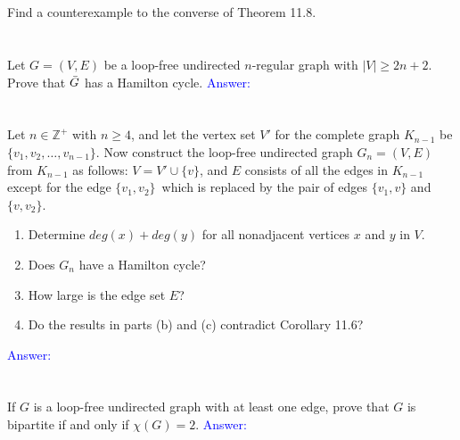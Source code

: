 \documentclass[a4paper]{article}
\begin{document}
\section{}
Find a counterexample to the converse of Theorem 11.8.

\section{}
Let $G=(V,E)$ be a loop-free undirected $n$-regular graph with $|V|\geq 2n+2$. Prove that $\Bar{G}$ has a Hamilton cycle.
\textcolor{blue}{Answer:}

\section{}
Let $n\in\mathbb{Z}^+$ with $n\geq 4$, and let the vertex set $V'$ for the complete graph $K_{n-1}$ be $\{v_1,v_2,\ldots, v_{n-1}\}$. Now construct the loop-free undirected graph $G_n=(V,E)$ from $K_{n-1}$ as follows: $V=V'\cup\{v\}$, and $E$ consists of all the edges in $K_{n-1}$ except for the edge $\{v_1,v_2\}$\, which is replaced by the pair of edges $\{v_1,v\}$ and $\{v,v_2\}$.
    \begin{enumerate}[label=\alph*)]
        \item Determine $deg(x)+deg(y)$ for all nonadjacent vertices $x$ and $y$ in $V$.
        \item Does $G_n$ have a Hamilton cycle?
        \item How large is the edge set $E$?
        \item Do the results in parts (b) and (c) contradict Corollary 11.6?
    \end{enumerate}
    \textcolor{blue}{Answer:}

\section{}
If $G$ is a loop-free undirected graph with at least one edge, prove that $G$ is bipartite if and only if $\chi(G)=2$.
    \textcolor{blue}{Answer:}
    
\end{document}

